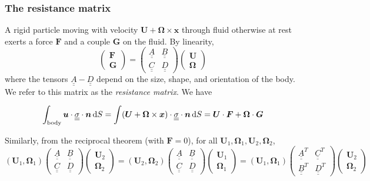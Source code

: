\documentclass{jknotes}
\newcommand{\dunder}[1]{\underline{\underline{#1}}}
\newcommand{\x}{\bm{x}}
\begin{document}
\subsubsection{The resistance matrix}
A rigid particle moving with velocity $\bm{U} + \bm{\Omega} \times \x$ through
fluid otherwise at rest exerts a force $\bm{F}$ and a couple $\bm{G}$ on the
fluid. By linearity,
\begin{equation}
\begin{pmatrix} \bm{F} \\ \bm{G}\end{pmatrix} = \begin{pmatrix} \dunder{A} & 
\dunder{B} \\ \dunder{C} & \dunder{D} \end{pmatrix} \begin{pmatrix} \bm{U} \\
\bm{\Omega} \end{pmatrix}
\end{equation}
where the tensors $\dunder{A} - \dunder{D}$ depend on the size, shape, and
orientation of the body. We refer to this matrix as the \emph{resistance
matrix}. We have 

\begin{equation}
	\int_{\text{body}} \bm{u}\cdot\dunder{\sigma}\cdot\bm{n}\,\diffd S = \int
	(\bm{U} + \bm{\Omega}\times\x)\cdot\dunder{\sigma}\cdot\bm{n}\,\diffd S
	= \bm{U} \cdot \bm{F} + \bm{\Omega} \cdot \bm{G}
\end{equation}

Similarly, from the reciprocal theorem (with $\bm{F} = 0$), for all $\bm{U}_1,
\bm{\Omega}_1, \bm{U}_2, \bm{\Omega}_2$, 
\begin{equation}
	(\bm{U}_1, \bm{\Omega}_1)\begin{pmatrix} \dunder{A} & \dunder{B} \\
	\dunder{C} & \dunder{D} \end{pmatrix} \begin{pmatrix} \bm{U}_2 \\
	\bm{\Omega}_2\end{pmatrix} = 
	(\bm{U}_2, \bm{\Omega}_2)\begin{pmatrix} \dunder{A} & \dunder{B} \\
	\dunder{C} & \dunder{D} \end{pmatrix} \begin{pmatrix} \bm{U}_1 \\
	\bm{\Omega}_1\end{pmatrix} = 
	(\bm{U}_1, \bm{\Omega}_1)\begin{pmatrix} \dunder{A}^T & \dunder{C}^T \\
	\dunder{B}^T & \dunder{D}^T \end{pmatrix} \begin{pmatrix} \bm{U}_2 \\
	\bm{\Omega}_2\end{pmatrix}
\end{equation}
\end{document}
